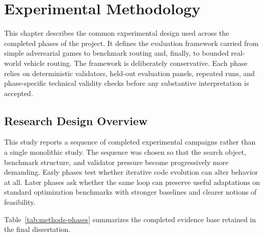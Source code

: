 \chapter{Experimental Methodology}
\label{chap:methodology}

This chapter describes the common experimental design used across the completed phases of the
project. It defines the evaluation framework carried from simple adversarial games to benchmark
routing and, finally, to bounded real-world vehicle routing. The framework is deliberately
conservative. Each phase relies on deterministic validators, held-out evaluation panels, repeated
runs, and phase-specific technical validity checks before any substantive interpretation is
accepted.

\section{Research Design Overview}
\label{sec:methods-overview}

This study reports a sequence of completed experimental campaigns rather than a single
monolithic study. The sequence was chosen so that the search object, benchmark structure, and
validator pressure become progressively more demanding. Early phases test whether iterative code
evolution can alter behavior at all. Later phases ask whether the same loop can preserve useful
adaptations on standard optimization benchmarks with stronger baselines and clearer notions of
feasibility.

Table~\ref{tab:methods-phases} summarizes the completed evidence base retained in the final
dissertation.

